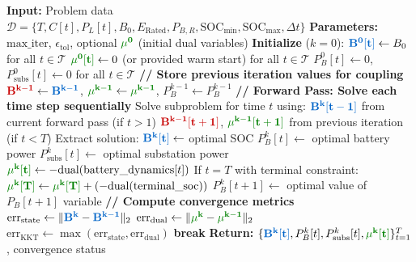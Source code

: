 \documentclass[11pt]{article}
\newcommand{\blueB}[1]{\textcolor{bluevar}{\mathbf{#1}}}      %
\newcommand{\redB}[1]{\textcolor{redvar}{\mathbf{#1}}}        %
\newcommand{\greenmu}[1]{\textcolor{greenvar}{\mathbf{#1}}}   %
\begin{document}
\begin{algorithm}[H]
\caption{DDP Forward Pass for Copper Plate MPOPF}
\begin{algorithmic}[1]
\State \textbf{Input:} Problem data $\mathcal{D} = \{T, C[t], P_L[t], B_0, E_{\text{Rated}}, P_{B,R}, \text{SOC}_{\min}, \text{SOC}_{\max}, \Delta t\}$
\State \textbf{Parameters:} $\text{max\_iter}$, $\epsilon_{\text{tol}}$, optional $\greenmu{\mu^0}$ (initial dual variables)
\State
\State \textbf{Initialize} ($k = 0$):
\State \hspace{1em} $\blueB{B^0[t]} \gets B_0$ for all $t \in \mathcal{T}$
\State \hspace{1em} $\greenmu{\mu^0[t]} \gets 0$ (or provided warm start) for all $t \in \mathcal{T}$
\State \hspace{1em} $P_B^0[t] \gets 0$, $P_{\text{subs}}^0[t] \gets 0$ for all $t \in \mathcal{T}$
\State
{}
    \State \textbf{// Store previous iteration values for coupling}
    \State $\redB{B^{k-1}} \gets \blueB{B^{k-1}}$, $\greenmu{\mu^{k-1}} \gets \greenmu{\mu^{k-1}}$, $P_B^{k-1} \gets P_B^{k-1}$
    \State
    \State \textbf{// Forward Pass: Solve each time step sequentially}
        \State Solve subproblem for time $t$ using:
        \State \hspace{2em} $\blueB{B^k[t-1]}$ from current forward pass (if $t > 1$)
        \State \hspace{2em} $\redB{B^{k-1}[t+1]}$, $\greenmu{\mu^{k-1}[t+1]}$ from previous iteration (if $t < T$)
        \State
        \State Extract solution:
        \State \hspace{2em} $\blueB{B^k[t]} \gets$ optimal SOC
        \State \hspace{2em} $P_B^k[t] \gets$ optimal battery power
        \State \hspace{2em} $P_{\text{subs}}^k[t] \gets$ optimal substation power
        \State \hspace{2em} $\greenmu{\mu^k[t]} \gets -\text{dual}(\text{battery\_dynamics}[t])$
        \State \hspace{2em} If $t = T$ with terminal constraint:
        \State \hspace{4em} $\greenmu{\mu^k[T]} \gets \greenmu{\mu^k[T]} + (-\text{dual}(\text{terminal\_soc}))$
        \State
            \State $P_B^k[t+1] \gets$ optimal value of $P_B[t+1]$ variable
        \EndIf
    \EndFor
    \State
    \State \textbf{// Compute convergence metrics}
    \State $\text{err}_{\text{state}} \gets \|\blueB{B^k} - \blueB{B^{k-1}}\|_2$
    \State $\text{err}_{\text{dual}} \gets \|\greenmu{\mu^k} - \greenmu{\mu^{k-1}}\|_2$
    \State $\text{err}_{\text{KKT}} \gets \max(\text{err}_{\text{state}}, \text{err}_{\text{dual}})$
    \State
        \State \textbf{break} 
    \EndIf
\EndFor
\State
\State \textbf{Return:} $\{\blueB{B^k[t]}, P_B^k[t], P_{\text{subs}}^k[t], \greenmu{\mu^k[t]}\}_{t=1}^T$, convergence status
\end{algorithmic}
\end{algorithm}
\end{document}
